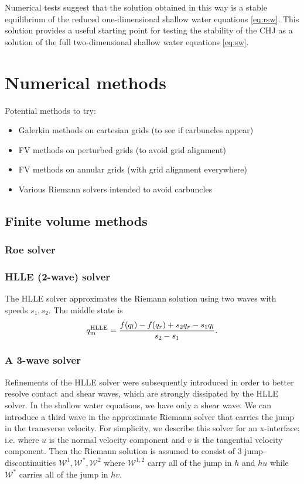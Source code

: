 \documentclass{article}
\newcommand{\W}{{\mathcal W}}
\begin{document}
Numerical tests suggest that the solution obtained in this way is a stable equilibrium
of the reduced one-dimensional shallow water equations \eqref{eq:rsw}.  This
solution provides a useful starting point for testing the stability of the CHJ
as a solution of the full two-dimensional shallow water equations \eqref{eq:sw}.

\section{Numerical methods}

Potential methods to try:
\begin{itemize}
    \item Galerkin methods on cartesian grids (to see if carbuncles appear)
    \item FV methods on perturbed grids (to avoid grid alignment)
    \item FV methods on annular grids (with grid alignment everywhere)
    \item Various Riemann solvers intended to avoid carbuncles
\end{itemize}

\subsection{Finite volume methods}

\subsubsection{Roe solver}

\subsubsection{HLLE (2-wave) solver}
The HLLE solver approximates the Riemann solution using two waves with
speeds $s_1, s_2$.  The middle state is
\begin{align} \label{qm-HLL}
    q_m^\textup{HLLE} = \frac{f(q_l) - f(q_r) + s_2 q_r - s_1 q_l}{s_2 - s_1}.
\end{align}


\subsubsection{A 3-wave solver}
Refinements of the HLLE solver were subsequently introduced in order to better
resolve contact and shear waves, which are strongly dissipated by the HLLE solver.
In the shallow water equations, we have only a shear wave.  We can introduce a third
wave in the approximate Riemann solver that carries the jump in the transverse velocity.
For simplicity, we describe this solver for an x-interface; i.e. where $u$ is the normal
velocity component and $v$ is the tangential velocity component.  Then the Riemann
solution is assumed to consist of 3 jump-discontinuities $\W^1, \W^*, \W^2$ where $\W^{1,2}$
carry all of the jump in $h$ and $hu$ while $\W^*$ carries all of the jump in $hv$.
\end{document}
